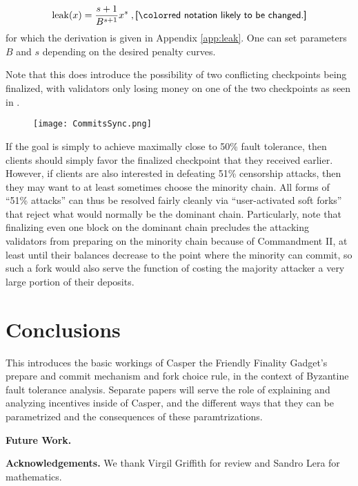 \documentclass[12pt, final]{article}
\begin{document}
\begin{equation}
    \operatorname{leak}(x) = \frac{s + 1}{B^{s + 1}} x^s \; , \textnormal{\todo{notation likely to be changed.}}
    \label{eq:leakformula}
\end{equation}
for which the derivation is given in Appendix \ref{app:leak}.  One can set parameters $B$ and $s$ depending on the desired penalty curves.

Note that this does introduce the possibility of two conflicting checkpoints being finalized, with validators only losing money on one of the two checkpoints as seen in .

\begin{figure}[h!tb]
\centering
\texttt{[image: CommitsSync.png]}
\caption{}
\label{fig:commitsync}
\end{figure}

If the goal is simply to achieve maximally close to 50\% fault tolerance, then clients should simply favor the finalized checkpoint that they received earlier. However, if clients are also interested in defeating 51\% censorship attacks, then they may want to at least sometimes choose the minority chain. All forms of ``51\% attacks'' can thus be resolved fairly cleanly via ``user-activated soft forks'' that reject what would normally be the dominant chain. Particularly, note that finalizing even one block on the dominant chain precludes the attacking validators from preparing on the minority chain because of Commandment II, at least until their balances decrease to the point where the minority can commit, so such a fork would also serve the function of costing the majority attacker a very large portion of their deposits.

\section{Conclusions}

This introduces the basic workings of Casper the Friendly Finality Gadget's prepare and commit mechanism and fork choice rule, in the context of Byzantine fault tolerance analysis. Separate papers will serve the role of explaining and analyzing incentives inside of Casper, and the different ways that they can be parametrized and the consequences of these paramtrizations.


\textbf{Future Work.} 

\textbf{Acknowledgements.}  We thank Virgil Griffith for review and Sandro Lera for mathematics.







\end{document}

